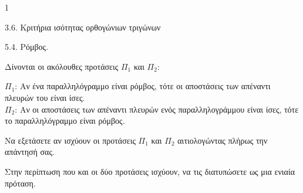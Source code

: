 \begin{ylh}{1}
    \item 3.6. Κριτήρια ισότητας ορθογώνιων τριγώνων
    \item 5.4. Ρόμβος.
\end{ylh}
Δίνονται οι ακόλουθες προτάσεις $\Pi_1$ και $\Pi_2$:

$\Pi_1$: Αν ένα παραλληλόγραμμο είναι ρόμβος, τότε οι αποστάσεις των απέναντι πλευρών του είναι ίσες.\\[0.2cm]
$\Pi_2$: Αν οι αποστάσεις των απέναντι πλευρών ενός παραλληλογράμμου είναι ίσες, τότε το παραλληλόγραμμο είναι ρόμβος.

\begin{alist}
    \item Να εξετάσετε αν ισχύουν οι προτάσεις $\Pi_1$ και $\Pi_2$ αιτιολογώντας πλήρως την απάντησή σας. 
    \item Στην περίπτωση που και οι δύο προτάσεις ισχύουν, να τις διατυπώσετε ως μια ενιαία πρόταση. 
\end{alist}
